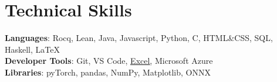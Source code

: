 \documentclass[letterpaper,11pt]{article}
\makeatletter
\newcommand{\resumeItem}[1]{
  \item\small{
    {#1 \vspace{-2pt}}
  }
}
\newcommand{\resumeSubSubheading}[2]{
    \item
    \begin{tabular*}{0.97\textwidth}{l@{\extracolsep{\fill}}r}
      \textit{\small#1} & \textit{\small #2} \\
    \end{tabular*}\vspace{-7pt}
}
\newcommand{\resumeSubHeadingListEnd}{\end{itemize}}
\newcommand{\resumeItemListStart}{\begin{itemize}}
\newcommand{\resumeItemListEnd}{\end{itemize}\vspace{-5pt}}
\makeatother
\begin{document}

\section{Technical Skills}
 \begin{itemize}[leftmargin=0.15in, label={}]
    \small{\item{
     \textbf{Languages}{: Rocq, Lean, Java, Javascript, Python, C, HTML\&CSS, SQL, Haskell, \LaTeX} \\
     \textbf{Developer Tools}{: Git, VS Code, \href{https://www.linkedin.com/learning/certificates/b7b8cc34a4ad7cac635039fd04ed8df52a4ddf36dc88c9671e1a6af1b4d5a68a?u=55034593}
     {\underline{Excel}}, Microsoft Azure}\\
     \textbf{Libraries}{: pyTorch, pandas, NumPy, Matplotlib, ONNX}
    }}
 \end{itemize}
\end{document}
